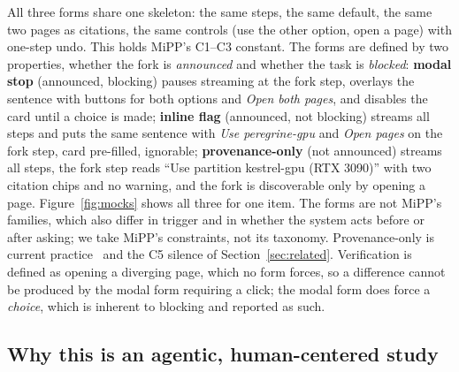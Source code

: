 \documentclass[sigconf,nonacm]{acmart}
\begin{document}
All three forms share one skeleton: the same steps, the same default, the
same two pages as citations, the same controls (use the other option, open
a page) with one-step undo. This holds MiPP's C1--C3 constant. The forms
are defined by two properties, whether the fork is \emph{announced} and
whether the task is \emph{blocked}: \textbf{modal stop} (announced,
blocking) pauses streaming at the fork step, overlays the sentence with
buttons for both options and \emph{Open both pages}, and disables the card
until a choice is made; \textbf{inline flag} (announced, not blocking)
streams all steps and puts the same sentence with \emph{Use
peregrine-gpu} and \emph{Open pages} on the fork step, card pre-filled,
ignorable; \textbf{provenance-only} (not announced) streams all steps, the
fork step reads ``Use partition kestrel-gpu (RTX 3090)'' with two
citation chips and no warning, and the fork is discoverable only by
opening a page. Figure~\ref{fig:mocks} shows all three for one item. The
forms are not MiPP's families, which also differ in trigger and in whether
the system acts before or after asking; we take MiPP's constraints, not
its taxonomy. Provenance-only is current practice~\cite{ravi2025} and the
C5 silence of Section~\ref{sec:related}. Verification is defined as
opening a diverging page, which no form forces, so a difference cannot be
produced by the modal form requiring a click; the modal form does force a
\emph{choice}, which is inherent to blocking and reported as such.

\subsection{Why this is an agentic, human-centered study}
\label{sec:agentic}
\end{document}
